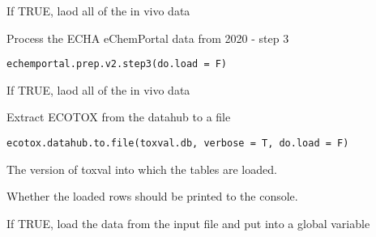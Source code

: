 \documentclass[letterpaper]{book}
\begin{document}
%
\begin{Arguments}
\begin{ldescription}
\item[\code{do.load}] If TRUE, laod all of the in vivo data
\end{ldescription}
\end{Arguments}
%
\begin{Description}\relax
Process the ECHA eChemPortal data from 2020 - step 3
\end{Description}
%
\begin{Usage}
\begin{verbatim}
echemportal.prep.v2.step3(do.load = F)
\end{verbatim}
\end{Usage}
%
\begin{Arguments}
\begin{ldescription}
\item[\code{do.load}] If TRUE, laod all of the in vivo data
\end{ldescription}
\end{Arguments}
%
\begin{Description}\relax
Extract ECOTOX from the datahub to a file
\end{Description}
%
\begin{Usage}
\begin{verbatim}
ecotox.datahub.to.file(toxval.db, verbose = T, do.load = F)
\end{verbatim}
\end{Usage}
%
\begin{Arguments}
\begin{ldescription}
\item[\code{toxval.db}] The version of toxval into which the tables are loaded.

\item[\code{verbose}] Whether the loaded rows should be printed to the console.

\item[\code{do.load}] If TRUE, load the data from the input file and put into a global variable
\end{ldescription}
\end{Arguments}
\end{document}

